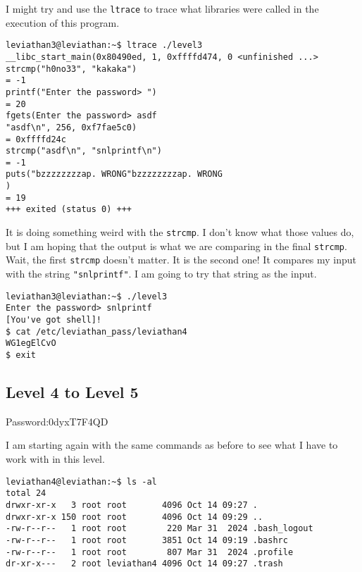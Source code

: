 \documentclass[11pt]{article}
\begin{document}
I might try and use the \verb|ltrace| to trace what libraries were called in the execution of this program.

\begin{lstlisting}
leviathan3@leviathan:~$ ltrace ./level3
__libc_start_main(0x80490ed, 1, 0xffffd474, 0 <unfinished ...>
strcmp("h0no33", "kakaka")                                                                               = -1
printf("Enter the password> ")                                                                           = 20
fgets(Enter the password> asdf
"asdf\n", 256, 0xf7fae5c0)                                                                         = 0xffffd24c
strcmp("asdf\n", "snlprintf\n")                                                                          = -1
puts("bzzzzzzzzap. WRONG"bzzzzzzzzap. WRONG
)                                                                               = 19
+++ exited (status 0) +++
\end{lstlisting}

It is doing something weird with the \verb|strcmp|. I don't know what those values do, but I am hoping that the output is what we are comparing in the final \verb|strcmp|. Wait, the first \verb|strcmp| doesn't matter. It is the second one! It compares my input with the string \verb|"snlprintf"|. I am going to try that string as the input.

\begin{lstlisting}
leviathan3@leviathan:~$ ./level3
Enter the password> snlprintf
[You've got shell]!
$ cat /etc/leviathan_pass/leviathan4
WG1egElCvO
$ exit
\end{lstlisting}


\subsection*{Level 4 to Level 5}
Password:0dyxT7F4QD

I am starting again with the same commands as before to see what I have to work with in this level. 
\begin{lstlisting}
leviathan4@leviathan:~$ ls -al
total 24
drwxr-xr-x   3 root root       4096 Oct 14 09:27 .
drwxr-xr-x 150 root root       4096 Oct 14 09:29 ..
-rw-r--r--   1 root root        220 Mar 31  2024 .bash_logout
-rw-r--r--   1 root root       3851 Oct 14 09:19 .bashrc
-rw-r--r--   1 root root        807 Mar 31  2024 .profile
dr-xr-x---   2 root leviathan4 4096 Oct 14 09:27 .trash
\end{lstlisting}
\end{document}
